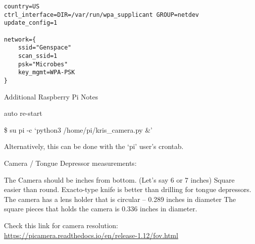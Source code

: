 \documentclass[]{book}
\begin{document}
\begin{verbatim}
country=US
ctrl_interface=DIR=/var/run/wpa_supplicant GROUP=netdev
update_config=1

network={
    ssid="Genspace"
    scan_ssid=1
    psk="Microbes"
    key_mgmt=WPA-PSK
}
\end{verbatim}

Additional Raspberry Pi Notes

auto re-start

\$ su pi -c `python3 /home/pi/kris\_camera.py \&'

Alternatively, this can be done with the `pi' user's crontab.

Camera / Tongue Depressor measurements:

The Camera should be inches from bottom. (Let's say 6 or 7 inches)
Square easier than round. Exacto-type knife is better than drilling for tongue depressors.
The camera has a lens holder that is circular -- 0.289 inches in diameter
The square pieces that holds the camera is 0.336 inches in diameter.

Check this link for camera resolution: \url{https://picamera.readthedocs.io/en/release-1.12/fov.html}


\end{document}
